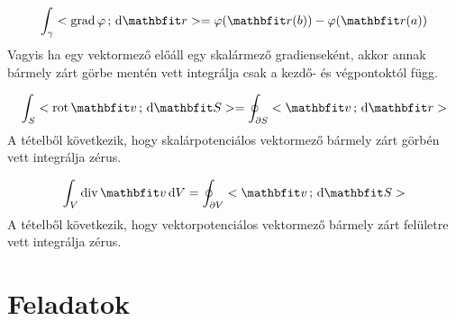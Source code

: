 \documentclass[lang=magyar]{math-handout}
\begin{document}
\vfill

\begin{block}
  \[
    \int_\gamma \scalar{\grad \varphi}{\diff \rvec r}
    =
    \varphi(\rvec r(b)) - \varphi(\rvec r(a))
  \]
  Vagyis ha egy vektormező előáll egy skalármező gradienseként, akkor annak
  bármely zárt görbe mentén vett integrálja csak a kezdő- és végpontoktól függ.

  \[
    \int_S \scalar{\rot \rvec v}{\diff \rvec S}
    =
    \oint_{\partial S} \scalar{\rvec v}{\diff \rvec r}
  \]
  A tételből következik, hogy skalárpotenciálos vektormező bármely zárt görbén
  vett integrálja zérus.

  \[
    \int_V \Div \rvec v \, \diff V
    =
    \oint_{\partial V} \scalar{\rvec v}{\diff \rvec S}
  \]
  A tételből következik, hogy vektorpotenciálos vektormező bármely zárt
  felületre vett integrálja zérus.
\end{block}

\clearpage

\clearpage
\section{Feladatok}
\end{document}
